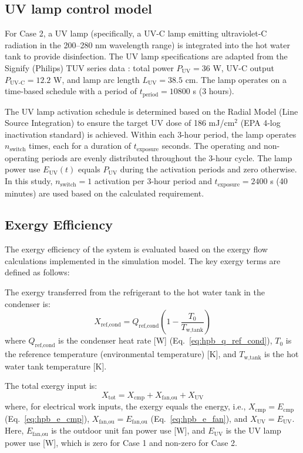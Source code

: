 \documentclass[letterpaper,10pt]{article}
\begin{document}
\subsection{UV lamp control model}

For Case 2, a UV lamp (specifically, a UV-C lamp emitting ultraviolet-C radiation in the 200--280 nm wavelength range) is integrated into the hot water tank to provide disinfection. The UV lamp specifications are adapted from the Signify (Philips) TUV series data \cite{signify2025catalogue}: total power $P_{\text{UV}} = 36$ W, UV-C output $P_{\text{UV-C}} = 12.2$ W, and lamp arc length $L_{\text{UV}} = 38.5$ cm. The lamp operates on a time-based schedule with a period of $t_{\text{period}} = 10800$ s (3 hours).

The UV lamp activation schedule is determined based on the Radial Model (Line Source Integration) \cite{bolton2000calculation, epa2006uv} to ensure the target UV dose of 186 mJ/cm$^2$ (EPA 4-log inactivation standard) is achieved. Within each 3-hour period, the lamp operates $n_{\text{switch}}$ times, each for a duration of $t_{\text{exposure}}$ seconds. The operating and non-operating periods are evenly distributed throughout the 3-hour cycle. The lamp power use $E_{\text{UV}}(t)$ equals $P_{\text{UV}}$ during the activation periods and zero otherwise. In this study, $n_{\text{switch}} = 1$ activation per 3-hour period and $t_{\text{exposure}} = 2400$ s (40 minutes) are used based on the calculated requirement.

\subsection{Exergy Efficiency}

The exergy efficiency of the system is evaluated based on the exergy flow calculations implemented in the simulation model. The key exergy terms are defined as follows:

The exergy transferred from the refrigerant to the hot water tank in the condenser is:
\begin{equation}
\label{eq:ex_ref_cond}
X_{\text{ref,cond}} = Q_{\text{ref,cond}} \left(1 - \frac{T_0}{T_{\text{w,tank}}}\right)
\end{equation}
where $Q_{\text{ref,cond}}$ is the condenser heat rate [W] (Eq.~\eqref{eq:hpb_q_ref_cond}), $T_0$ is the reference temperature (environmental temperature) [K], and $T_{\text{w,tank}}$ is the hot water tank temperature [K].

The total exergy input is:
\begin{equation}
\label{eq:ex_tot}
X_{\text{tot}} = X_{\text{cmp}} + X_{\text{fan,ou}} + X_{\text{UV}}
\end{equation}
where, for electrical work inputs, the exergy equals the energy, i.e., $X_{\text{cmp}} = E_{\text{cmp}}$ (Eq.~\eqref{eq:hpb_e_cmp}), $X_{\text{fan,ou}} = E_{\text{fan,ou}}$ (Eq.~\eqref{eq:hpb_e_fan}), and $X_{\text{UV}} = E_{\text{UV}}$. Here, $E_{\text{fan,ou}}$ is the outdoor unit fan power use [W], and $E_{\text{UV}}$ is the UV lamp power use [W], which is zero for Case 1 and non-zero for Case 2.
\end{document}
